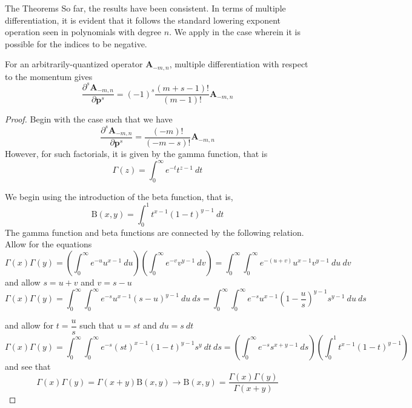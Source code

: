\documentclass[aspectratio=169]{beamer}
\begin{document}
\begin{frame}[allowframebreaks]{The Theorems}
		So far, the results have been consistent. In terms of multiple differentiation, it is evident that it follows the standard lowering exponent operation seen in polynomials with degree $n$. We apply in the case wherein it is possible for the indices to be negative.
		
		\begin{theorem}
			For an arbitrarily-quantized operator $\textbf{A}_{-m,n}$, multiple differentiation with respect to the momentum	gives
			\begin{equation}
				\frac{\partial^s\textbf{A}_{-m,n}}{\partial\textbf{p}^s}=(-1)^{s}\frac{(m+s-1)!}{(m-1)!}\textbf{A}_{-m,n}
			\end{equation}
		\end{theorem}
		\begin{proof}
			Begin with the case such that we have
			\begin{equation}
				\frac{\partial^s\textbf{A}_{-m,n}}{\partial\textbf{p}^s}=\frac{(-m)!}{(-m-s)!}\textbf{A}_{-m,n}
			\end{equation}
			However, for such factorials, it is given by the gamma function, that is
			\begin{equation}
				\Gamma(z)=\int_0^\infty e^{-t}t^{z-1}~dt
			\end{equation}
			
			\framebreak
			We begin using the introduction of the beta function, that is,
			\begin{equation}
				\text{B}(x,y)=\int_0^1t^{x-1}(1-t)^{y-1}~dt
			\end{equation}
			The gamma function and beta functions are connected by the following relation. Allow for the equations
			\begin{equation}
				\Gamma(x)\Gamma(y)=\left(\int_0^\infty e^{-u}u^{x-1}~du\right) \left(\int_0^\infty e^{-v}v^{y-1}~dv\right)=\int_0^\infty\int_0^\infty e^{-(u+v)}u^{x-1}v^{y-1}~du~dv
			\end{equation}
			and allow $s=u+v$ and $v=s-u$
			\begin{equation}
				\Gamma(x)\Gamma(y)=\int_0^\infty\int_0^\infty e^{-s}u^{x-1}(s-u)^{y-1}~du~ds=\int_0^\infty\int_0^\infty e^{-s}u^{x-1}\left(1-\frac{u}{s}\right)^{y-1}s^{y-1}~du~ds
			\end{equation}
			
			\framebreak
			and allow for $t=\dfrac{u}{s}$ such that $u=st$ and $du=s~dt$
			\begin{equation}
				\Gamma(x)\Gamma(y)=\int_0^\infty\int_0^\infty e^{-s}(st)^{x-1}\left(1-t\right)^{y-1}s^{y}~dt~ds=\left(\int_0^\infty e^{-s}s^{x+y-1}~ds\right)\left(\int_0^1t^{x-1}(1-t)^{y-1}\right) 
			\end{equation}
			and see that
			\begin{equation}
				\Gamma(x)\Gamma(y)=\Gamma(x+y)\text{B}(x,y)\longrightarrow\text{B}(x,y)=\frac{\Gamma(x)\Gamma(y)}{\Gamma(x+y)}
			\end{equation}
			

\end{proof}
\end{frame}
\end{document}

